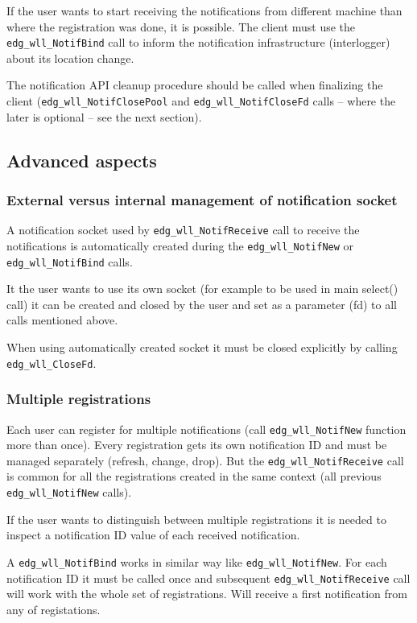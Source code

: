 If the user wants to start receiving the notifications from different
machine than where the registration was done, it is possible. The
client must use the \verb'edg_wll_NotifBind' call to inform the
notification infrastructure (interlogger) about its location change.

The notification API cleanup procedure should be called when
finalizing the client (\verb'edg_wll_NotifClosePool' and 
\verb'edg_wll_NotifCloseFd' calls -- where the later is optional 
-- see the next section).

\subsection{Advanced aspects}

\subsubsection{External versus internal management of notification socket}
A notification socket used by \verb'edg_wll_NotifReceive' call to
receive the notifications is automatically created during the
\verb'edg_wll_NotifNew' or \verb'edg_wll_NotifBind' calls.

It the user wants to use its own socket (for example to be used in
main select() call) it can be created and closed by the user and set
as a parameter (fd) to all calls mentioned above.

When using automatically created socket it must be closed explicitly
by calling \verb'edg_wll_CloseFd'.

\subsubsection{Multiple registrations}
Each user can register for multiple notifications (call
\verb'edg_wll_NotifNew' function more than once). Every registration
gets its own notification ID and must be managed separately (refresh,
change, drop). But the \verb'edg_wll_NotifReceive' call is common for
all the registrations created in the same context (all previous
\verb'edg_wll_NotifNew' calls). 

If the user wants to distinguish between multiple registrations it is
needed to inspect a notification ID value of each received notification.

A \verb'edg_wll_NotifBind' works in similar way like
\verb'edg_wll_NotifNew'. For each notification ID it must be called
once and subsequent \verb'edg_wll_NotifReceive' call will work with
the whole set of registrations. Will receive a first notification from
any of registations.

